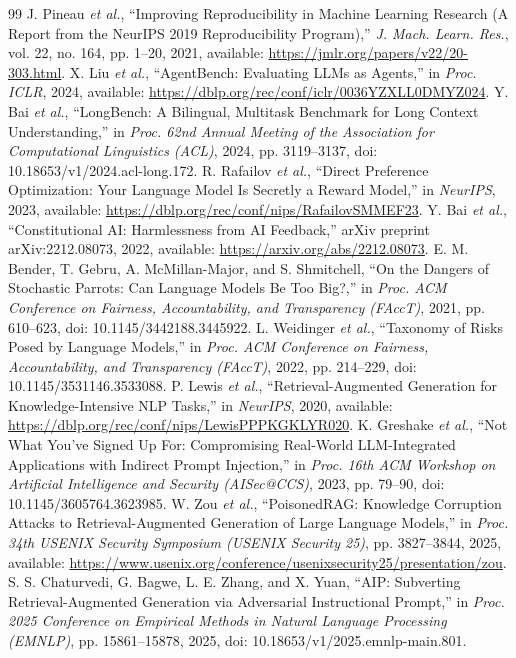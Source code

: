 ﻿\documentclass[a4paper,12pt]{article}
\begin{document}
\begin{thebibliography}{99}
 J. Pineau \emph{et al.}, ``Improving Reproducibility in Machine Learning Research (A Report from the NeurIPS 2019 Reproducibility Program),'' \emph{J. Mach. Learn. Res.}, vol. 22, no. 164, pp. 1--20, 2021, available: \url{https://jmlr.org/papers/v22/20-303.html}.
 X. Liu \emph{et al.}, ``AgentBench: Evaluating LLMs as Agents,'' in \emph{Proc. ICLR}, 2024, available: \url{https://dblp.org/rec/conf/iclr/0036YZXLL0DMYZ024}.
 Y. Bai \emph{et al.}, ``LongBench: A Bilingual, Multitask Benchmark for Long Context Understanding,'' in \emph{Proc. 62nd Annual Meeting of the Association for Computational Linguistics (ACL)}, 2024, pp. 3119--3137, doi: 10.18653/v1/2024.acl-long.172.
 R. Rafailov \emph{et al.}, ``Direct Preference Optimization: Your Language Model Is Secretly a Reward Model,'' in \emph{NeurIPS}, 2023, available: \url{https://dblp.org/rec/conf/nips/RafailovSMMEF23}.
 Y. Bai \emph{et al.}, ``Constitutional AI: Harmlessness from AI Feedback,'' arXiv preprint arXiv:2212.08073, 2022, available: \url{https://arxiv.org/abs/2212.08073}.
 E. M. Bender, T. Gebru, A. McMillan-Major, and S. Shmitchell, ``On the Dangers of Stochastic Parrots: Can Language Models Be Too Big?,'' in \emph{Proc. ACM Conference on Fairness, Accountability, and Transparency (FAccT)}, 2021, pp. 610--623, doi: 10.1145/3442188.3445922.
 L. Weidinger \emph{et al.}, ``Taxonomy of Risks Posed by Language Models,'' in \emph{Proc. ACM Conference on Fairness, Accountability, and Transparency (FAccT)}, 2022, pp. 214--229, doi: 10.1145/3531146.3533088.
 P. Lewis \emph{et al.}, ``Retrieval-Augmented Generation for Knowledge-Intensive NLP Tasks,'' in \emph{NeurIPS}, 2020, available: \url{https://dblp.org/rec/conf/nips/LewisPPPKGKLYR020}.
 K. Greshake \emph{et al.}, ``Not What You've Signed Up For: Compromising Real-World LLM-Integrated Applications with Indirect Prompt Injection,'' in \emph{Proc. 16th ACM Workshop on Artificial Intelligence and Security (AISec@CCS)}, 2023, pp. 79--90, doi: 10.1145/3605764.3623985.
 W. Zou \emph{et al.}, ``PoisonedRAG: Knowledge Corruption Attacks to Retrieval-Augmented Generation of Large Language Models,'' in \emph{Proc. 34th USENIX Security Symposium (USENIX Security 25)}, pp. 3827--3844, 2025, available: \url{https://www.usenix.org/conference/usenixsecurity25/presentation/zou}.
 S. S. Chaturvedi, G. Bagwe, L. E. Zhang, and X. Yuan, ``AIP: Subverting Retrieval-Augmented Generation via Adversarial Instructional Prompt,'' in \emph{Proc. 2025 Conference on Empirical Methods in Natural Language Processing (EMNLP)}, pp. 15861--15878, 2025, doi: 10.18653/v1/2025.emnlp-main.801.

\end{thebibliography}
\end{document}
